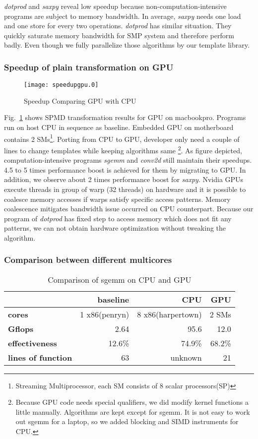 \textit{dotprod} and \textit{saxpy} reveal low speedup because non-computation-intensive
programs are subject to memory bandwidth.  In average, \textit{saxpy} needs one load and one 
store for every two operations. \textit{dotprod} has similar
situation. They quickly saturate memory bandwidth for SMP system and
therefore perform badly. Even though we fully parallelize those
algorithms by our template library. 
\subsubsection{Speedup of  plain transformation on GPU}
\begin{figure}
\texttt{[image: speedupgpu.0]}
\caption{Speedup Comparing GPU with CPU}\label{fig:spdgpu}
\end{figure}

Fig.~\ref{fig:spdgpu} shows SPMD transformation results for GPU on
macbookpro. Programs run on host CPU  in sequence as
baseline. Embedded GPU on motherboard contains 2
SMs\footnote{Streaming Multiprocessor, each SM consists of 8 scalar processors(SP)}.
Porting from CPU to GPU, developer only need a couple of lines to change
templates while keeping algorithms same \footnote{
Because GPU code needs special qualifiers, we did modify kernel
functions a little manually.  Algorithms are kept except for sgemm. It is not easy
 to work out sgemm for a laptop, so we added blocking and SIMD
 instruments for CPU.}. As figure depicted,  computation-intensive programs
\textit{sgemm} and \textit{conv2d} still maintain their speedups. 4.5 to 5 times
performance boost is achieved for them by migrating to GPU.
In addition, we observe about 2 times performance boost for
\textit{saxpy}. Nvidia GPUs execute
threads in group of warp (32 threads) on hardware and it is
possible to coalesce memory accesses if warps satisfy
specific access patterns. Memory coalescence mitigates bandwidth issue
occurred on CPU counterpart. Because our program of \textit{dotprod} has fixed
step to access memory which does not fit any patterns, we can not
obtain hardware optimization without tweaking the algorithm.

\subsubsection{Comparison between different multicores}
\begin{table}[hbt]
\caption{Comparison of sgemm on CPU and GPU}\label{tbl:sgemm}
\begin{tabular}{|l|r|r|r|}
\hline
& baseline& CPU & GPU\\
\hline
\textbf{cores} &1 x86(penryn)& 8 x86(harpertown)& 2 SMs\\
\hline
\textbf{Gflops}& 2.64 &95.6&  12.0\\
\hline
\textbf{effectiveness}&12.6\%& 74.9\%&68.2\%\\
\hline
\textbf{lines of function}&63&unknown&21\\
\hline
\end{tabular}
\end{table}

